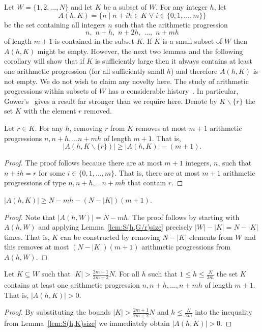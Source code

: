 \documentclass[journal]{IEEEtran}
\begin{document}
Let $W = \{1,2,\dots, N\}$ and let $K$ be a subset of $W$.  For any integer $h$, let
\begin{equation} \label{eq:S(h,G)def} 
A(h,K) = \big\{ n \mid n + ih \in K \;\forall\; i \in \{0,1,\dots,m\} \big\}
\end{equation}
be the set containing all integers $n$ such that the arithmetic progression
\[
n, \,\, n + h, \,\, n + 2h, \,\, \dots, \,\, n + mh
\]
of length $m+1$ is contained in the subset $K$.  If $K$ is a small subset of $W$ then $A(h,K)$ might be empty. However, the next two lemmas and the following corollary will show that if $K$ is sufficiently large then it always contains at least one arithmetic progression (for all sufficiently small $h$) and therefore $A(h,K)$ is not empty. We do not wish to claim any novelty here.  The study of arithmetic progressions within subsets of $W$ has a considerable history~\cite{Erdos_on_some_sequence_of_integers1936,Szemeredi_setint_no_k_arth1975,Gowers_new_proof2001}.  In particular, Gower's~\cite[Theorem 1.3]{Gowers_new_proof2001} gives a result far stronger than we require here.  Denote by $K \backslash \{r\}$ the set $K$ with the element $r$ removed.

\begin{lemma} \label{lem:S(h,G/r)size}
Let $r \in K$.  For any $h$, removing $r$ from $K$ removes at most $m+1$ arithmetic progressions $n, n+h, \dots n+mh$ of length $m+1$.  That is,
\[
|A(h,K \backslash \{r\})| \geq |A(h,K)| - (m+1).
\]
\end{lemma}
\begin{proof}
The proof follows because there are at most $m+1$ integers, $n$, such that $n+ih = r$ for some $i \in \{0,1,\dots,m\}$.  That is, there are at most $m+1$ arithmetic progressions of type $n, n+h, \dots n+mh$ that contain $r$.
\end{proof}

 \begin{lemma} \label{lem:S(h,K)size}
 $|A(h,K)| \geq N - mh - (N - |K|)(m+1)$.
 \end{lemma}
 \begin{proof}
 Note that $|A(h,W)| = N - mh$.  The proof follows by starting with $A(h,W)$ and applying Lemma~\ref{lem:S(h,G/r)size} precisely $|W|-|K|=N-|K|$ times. That is, $K$ can be constructed by removing $N - |K|$ elements from $W$ and this removes at most $(N - |K|)(m+1)$ arithmetic progressions from $A(h,W)$.
 \end{proof}
 
 \begin{corollary} \label{cor:S(h,K)>0}
 Let $K \subseteq W$ such that $|K| > \frac{2m+1}{2m+2}N$. For all $h$ such that $1\leq h \leq\frac{N}{2m}$ the set $K$ contains at least one arithmetic progression $n, n+h, \dots, n+mh$ of length $m+1$. That is, $|A(h,K)| > 0$.
 \end{corollary}
 \begin{proof}
 By substituting the bounds $|K| > \frac{2m+1}{2m+2}N$ and $h \leq\frac{N}{2m}$ into the inequality from Lemma~\ref{lem:S(h,K)size} we immediately obtain $|A(h,K)| > 0$.
 \end{proof}
\end{document}
